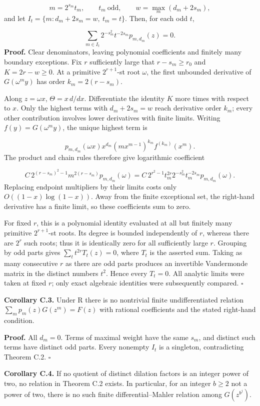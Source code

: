 \documentclass[11pt,a4paper]{article}
\begin{document}
\[
m=2^{s_m}t_m,\qquad t_m\ \mathrm{odd},\qquad
w=\max_m(d_m+2s_m),
\]
and let $I_t=\{m:d_m+2s_m=w,\ t_m=t\}$. Then, for each odd $t$,

\[
\sum_{m\in I_t}2^{-s_m^2}t^{-2s_m}p_{m,d_m}(z)=0.
\]
\textbf{Proof.} Clear denominators, leaving polynomial coefficients and finitely many boundary exceptions. Fix $r$ sufficiently large that $r-s_m\ge r_0$ and $K=2r-w\ge0$. At a primitive $2^{r+1}$-st root $\omega$, the first unbounded derivative of $G(\omega^m y)$ has order $k_m=2(r-s_m)$.

Along $z=\omega x$, $\Theta=x\,d/dx$. Differentiate the identity $K$ more times with respect to $x$. Only the highest terms with $d_m+2s_m=w$ reach derivative order $k_m$; every other contribution involves lower derivatives with finite limits. Writing $f(y)=G(\omega^m y)$, the unique highest term is

\[
p_{m,d_m}(\omega x)x^{d_m}(mx^{m-1})^{k_m}f^{(k_m)}(x^m).
\]
The product and chain rules therefore give logarithmic coefficient

\[
C\,2^{(r-s_m)^2-1}m^{2(r-s_m)}p_{m,d_m}(\omega)
=C\,2^{r^2-1}t_m^{2r}2^{-s_m^2}t_m^{-2s_m}p_{m,d_m}(\omega).
\]
Replacing endpoint multipliers by their limits costs only $O((1-x)\log(1-x))$. Away from the finite exceptional set, the right-hand derivative has a finite limit, so these coefficients sum to zero.

For fixed $r$, this is a polynomial identity evaluated at all but finitely many primitive $2^{r+1}$-st roots. Its degree is bounded independently of $r$, whereas there are $2^r$ such roots; thus it is identically zero for all sufficiently large $r$. Grouping by odd parts gives $\sum_t t^{2r}T_t(z)=0$, where $T_t$ is the asserted sum. Taking as many consecutive $r$ as there are odd parts produces an invertible Vandermonde matrix in the distinct numbers $t^2$. Hence every $T_t=0$. All analytic limits were taken at fixed $r$; only exact algebraic identities were subsequently compared. $\square$

\textbf{Corollary C.3.} Under R there is no nontrivial finite undifferentiated relation $\sum_m p_m(z)G(z^m)=F(z)$ with rational coefficients and the stated right-hand condition.

\textbf{Proof.} All $d_m=0$. Terms of maximal weight have the same $s_m$, and distinct such terms have distinct odd parts. Every nonempty $I_t$ is a singleton, contradicting Theorem C.2. $\square$

\textbf{Corollary C.4.} If no quotient of distinct dilation factors is an integer power of two, no relation in Theorem C.2 exists. In particular, for an integer $b\ge2$ not a power of two, there is no such finite differential–Mahler relation among $G(z^{b^j})$.
\end{document}
